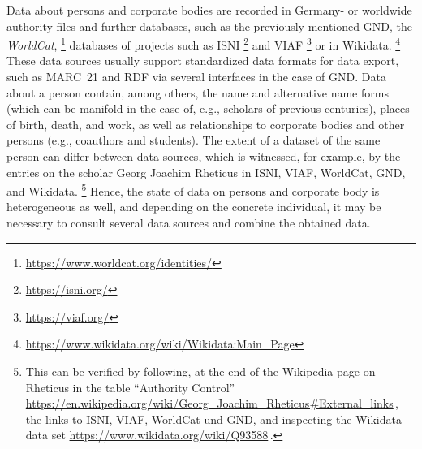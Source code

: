 Data about persons and corporate bodies are recorded
in Germany- or worldwide authority files and further databases,
such as the previously mentioned GND,
the \emph{WorldCat},%
\footnote{\url{https://www.worldcat.org/identities/}}
databases of projects such as ISNI%
\footnote{\url{https://isni.org/}}
and VIAF%
\footnote{\url{https://viaf.org/}}
or in Wikidata.%
\footnote{\url{https://www.wikidata.org/wiki/Wikidata:Main_Page}}
These data sources usually support standardized data formats for data export,
such as MARC~21 and RDF via several interfaces in the case of GND.
Data about a person contain, among others, the name and alternative name forms
(which can be manifold in the case of, e.g., scholars of previous centuries),
places of birth, death, and work,
as well as relationships to corporate bodies and other persons
(e.g., coauthors and students).
The extent of a dataset of the same person can differ between data sources,
which is witnessed, for example, by the entries on the scholar
Georg Joachim Rheticus in ISNI, VIAF, WorldCat, GND, and Wikidata.%
\footnote{%
  This can be verified by following,
  at the end of the Wikipedia page on Rheticus 
  in the table \enquote{Authority Control} \url{https://en.wikipedia.org/wiki/Georg_Joachim_Rheticus\#External_links}\,,
  the links to ISNI, VIAF, WorldCat und GND,
  and inspecting the Wikidata data set
  \url{https://www.wikidata.org/wiki/Q93588}\,.
}
Hence, the state of data on persons and corporate body is heterogeneous as well,
and depending on the concrete individual, it may be necessary
to consult several data sources and combine the obtained data.

